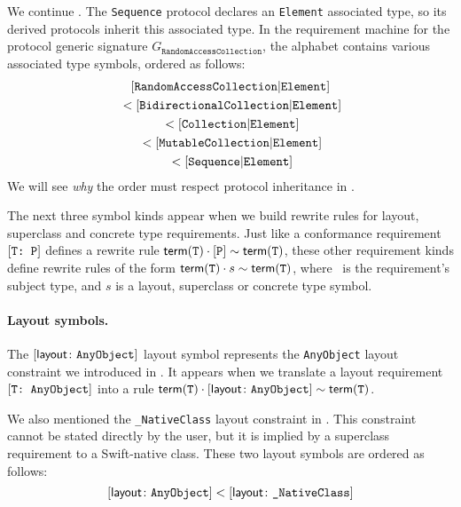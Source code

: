 \documentclass[../generics]{subfiles}
\begin{document}
\begin{example}
We continue . The \texttt{Sequence} protocol declares an \texttt{Element} associated type, so its derived protocols inherit this associated type. In the requirement machine for the protocol generic signature $G_\texttt{RandomAccessCollection}$, the alphabet contains various associated type symbols, ordered as follows:
\begin{gather*}
[\texttt{RandomAccessCollection}|\texttt{Element}]\\
{} < [\texttt{BidirectionalCollection}|\texttt{Element}]\\
{} < [\texttt{Collection}|\texttt{Element}]\\
{} < [\texttt{MutableCollection}|\texttt{Element}]\\
{} < [\texttt{Sequence}|\texttt{Element}]
\end{gather*}
We will see \emph{why} the order must respect protocol inheritance in .
\end{example}

\medskip

The next three symbol kinds appear when we build rewrite rules for layout, superclass and concrete type requirements. Just like a conformance requirement $[\texttt{T:~P}]$ defines a rewrite rule $\mathsf{term}(\texttt{T})\cdot[\texttt{P}]\sim\mathsf{term}(\texttt{T})$, these other requirement kinds define rewrite rules of the form $\mathsf{term}(\texttt{T})\cdot s\sim\mathsf{term}(\texttt{T})$, where \tT\ is the requirement's subject type, and $s$ is a layout, superclass or concrete type symbol.

\paragraph{Layout symbols.} The $[\mathsf{layout}\colon\texttt{AnyObject}]$ layout symbol represents the \texttt{AnyObject} layout constraint we introduced in . It appears when we translate a layout requirement $[\texttt{T:~AnyObject}]$ into a rule $\mathsf{term}(\texttt{T})\cdot[\mathsf{layout}\colon\texttt{AnyObject}] \sim \mathsf{term}(\texttt{T})$.

We also mentioned the \verb|_NativeClass| layout constraint in . This constraint cannot be stated directly by the user, but it is implied by a superclass requirement to a Swift-native class. These two layout symbols are ordered as follows:
\[\layoutsym{AnyObject} < \layoutsym{\char`_NativeClass}\]
\end{document}
